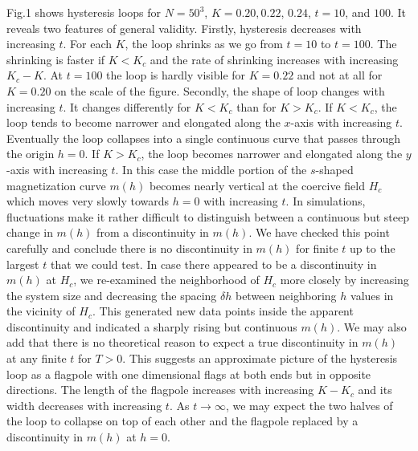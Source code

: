 \documentclass[a4,aps,amsmath,floatfix,nofootinbib,10pt]{revtex4}
\begin{document}
Fig.1 shows hysteresis loops for $N=50^3$, $K=0.20, 0.22$, $0.24$, 
$t=10$, and $100$. It reveals two features of general validity. 
Firstly, hysteresis decreases with increasing $t$. For each $K$, the 
loop shrinks as we go from $t=10$ to $t=100$. The shrinking is faster 
if $K<K_c$ and the rate of shrinking increases with increasing $K_c-K$. 
At $t=100$ the loop is hardly visible for $K=0.22$ and not at all for 
$K=0.20$ on the scale of the figure. Secondly, the shape of loop 
changes with increasing $t$. It changes differently for $K<K_c$ than 
for $K>K_c$. If $K<K_c$, the loop tends to become narrower and 
elongated along the $x$-axis with increasing $t$. Eventually the loop 
collapses into a single continuous curve that passes through the origin 
$h=0$. If $K>K_c$, the loop becomes narrower and elongated along the 
$y$-axis with increasing $t$. In this case the middle portion of the 
$s$-shaped magnetization curve $m(h)$ becomes nearly vertical at the 
coercive field $H_c$ which moves very slowly towards $h=0$ with 
increasing $t$. In simulations, fluctuations make it rather difficult 
to distinguish between a continuous but steep change in $m(h)$ from a 
discontinuity in $m(h)$. We have checked this point carefully and 
conclude there is no discontinuity in $m(h)$ for finite $t$ up to the 
largest $t$ that we could test. In case there appeared to be a 
discontinuity in $m(h)$ at $H_c$, we re-examined the neighborhood of 
$H_c$ more closely by increasing the system size and decreasing the 
spacing $\delta h$ between neighboring $h$ values in the vicinity of 
$H_c$. This generated new data points inside the apparent discontinuity 
and indicated a sharply rising but continuous $m(h)$. We may also add 
that there is no theoretical reason to expect a true discontinuity in 
$m(h)$ at any finite $t$ for $T>0$. This suggests an approximate 
picture of the hysteresis loop as a flagpole with one dimensional flags 
at both ends but in opposite directions. The length of the flagpole 
increases with increasing $K-K_c$ and its width decreases with 
increasing $t$. As $t \to \infty$, we may expect the two halves of the 
loop to collapse on top of each other and the flagpole replaced by a 
discontinuity in $m(h)$ at $h=0$.
\end{document}
